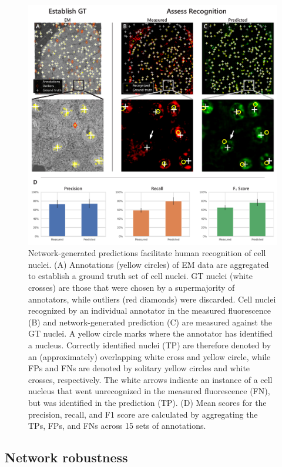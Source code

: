 \begin{figure}[!tb]
    \centering
    \includegraphics[width=\linewidth]{chapter-4/figures_PDF/fig4-3_counting.pdf}
    \caption{Network-generated predictions facilitate human recognition of cell nuclei.
    (A) Annotations (yellow circles) of EM data are aggregated to establish a ground truth set of cell nuclei. GT nuclei (white crosses) are those that were chosen by a supermajority of annotators, while outliers (red diamonds) were discarded.
    Cell nuclei recognized by an individual annotator in the measured fluorescence (B) and network-generated prediction (C) are measured against the GT nuclei. A yellow circle marks where the annotator has identified a nucleus. Correctly identified nuclei (TP) are therefore denoted by an (approximately) overlapping white cross and yellow circle, while FPs and FNs are denoted by solitary yellow circles and white crosses, respectively. The white arrows indicate an instance of a cell nucleus that went unrecognized in the measured fluorescence (FN), but was identified in the prediction (TP).
    (D) Mean scores for the precision, recall, and F1 score are calculated by aggregating the TPs, FPs, and FNs across 15 sets of annotations.}
    \label{fig:4.3_counting}
\end{figure}


\subsection{Network robustness}
\label{sec:4results_robustness}

